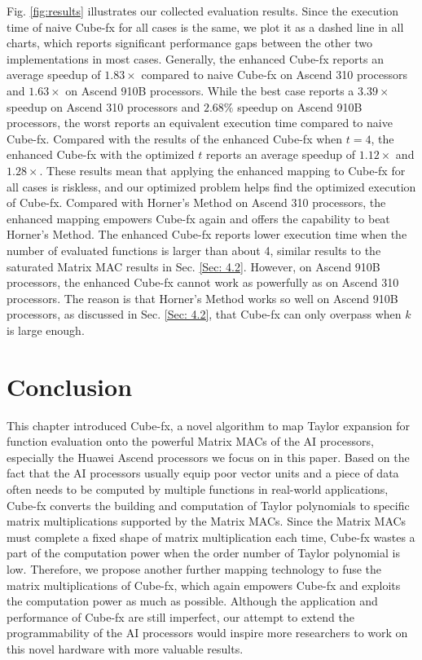 Fig. \ref{fig:results} illustrates our collected evaluation results. Since the execution time of naive Cube-fx for all cases is the same, we plot it as a dashed line in all charts, which reports significant performance gaps between the other two implementations in most cases. Generally, the enhanced Cube-fx reports an average speedup of $1.83\times$ compared to naive Cube-fx on Ascend 310 processors and $1.63\times$ on Ascend 910B processors. While the best case reports a $3.39\times$ speedup on Ascend 310 processors and $2.68\%$ speedup on Ascend 910B processors, the worst reports an equivalent execution time compared to naive Cube-fx. Compared with the results of the enhanced Cube-fx when $t = 4$, the enhanced Cube-fx with the optimized $t$ reports an average speedup of $1.12\times$ and $1.28\times$. These results mean that applying the enhanced mapping to Cube-fx for all cases is riskless, and our optimized problem helps find the optimized execution of Cube-fx. Compared with Horner's Method on Ascend 310 processors, the enhanced mapping empowers Cube-fx again and offers the capability to beat Horner's Method. The enhanced Cube-fx reports lower execution time when the number of evaluated functions is larger than about 4, similar results to the saturated Matrix MAC results in Sec. \ref{Sec: 4.2}. However, on Ascend 910B processors, the enhanced Cube-fx cannot work as powerfully as on Ascend 310 processors. The reason is that Horner's Method works so well on Ascend 910B processors, as discussed in Sec. \ref{Sec: 4.2}, that Cube-fx can only overpass when $k$ is large enough.

\section{Conclusion \label{sec:8}}

This chapter introduced Cube-fx, a novel algorithm to map Taylor expansion for function evaluation onto the powerful Matrix MACs of the AI processors, especially the Huawei Ascend processors we focus on in this paper. Based on the fact that the AI processors usually equip poor vector units and a piece of data often needs to be computed by multiple functions in real-world applications, Cube-fx converts the building and computation of Taylor polynomials to specific matrix multiplications supported by the Matrix MACs. Since the Matrix MACs must complete a fixed shape of matrix multiplication each time, Cube-fx wastes a part of the computation power when the order number of Taylor polynomial is low. Therefore, we propose another further mapping technology to fuse the matrix multiplications of Cube-fx, which again empowers Cube-fx and exploits the computation power as much as possible. Although the application and performance of Cube-fx are still imperfect, our attempt to extend the programmability of the AI processors would inspire more researchers to work on this novel hardware with more valuable results.